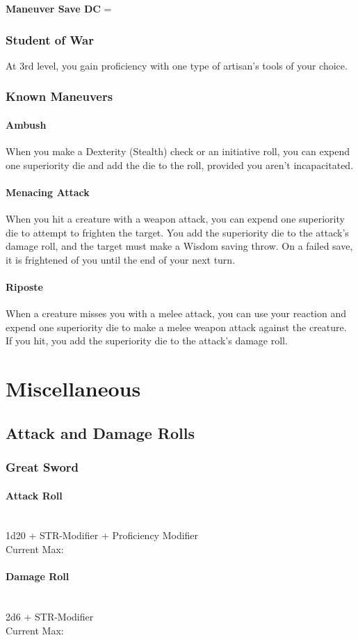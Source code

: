 {\textbf{Maneuver Save DC} = 
\subsubsection*{Student of War}
At 3rd level, you gain proficiency with one type of artisan's tools of your choice.
\subsubsection*{Known Maneuvers}
\paragraph*{Ambush}
When you make a Dexterity (Stealth) check or an initiative roll, you can expend one superiority die and add the die to the roll, provided you aren't incapacitated.
\paragraph*{Menacing Attack}
When you hit a creature with a weapon attack, you can expend one superiority die to attempt to frighten the target. You add the superiority die to the attack's damage roll, and the target must make a Wisdom saving throw. On a failed save, it is frightened of you until the end of your next turn.
\paragraph*{Riposte}
When a creature misses you with a melee attack, you can use your reaction and expend one superiority die to make a melee weapon attack against the creature. If you hit, you add the superiority die to the attack's damage roll.

\section*{Miscellaneous}
\subsection*{Attack and Damage Rolls}
\subsubsection*{Great Sword}
\paragraph*{Attack Roll}\hfill\\
1d20 + STR-Modifier + Proficiency Modifier \\
\indent Current Max: 
\paragraph*{Damage Roll}\hfill\\
2d6 + STR-Modifier\\
\indent Current Max: \\
}